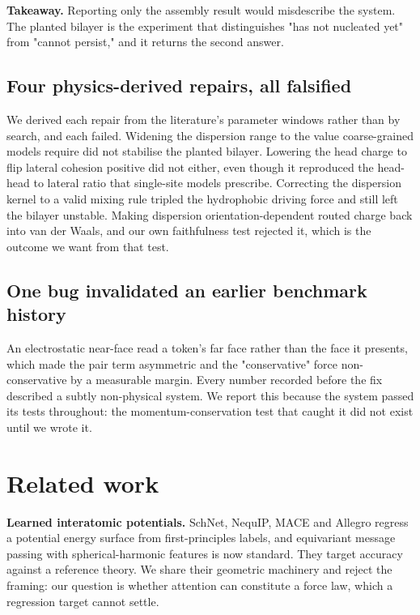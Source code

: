 \documentclass[10pt,twocolumn]{article}
\begin{document}
\textbf{Takeaway.} Reporting only the assembly result would misdescribe the system. The planted
bilayer is the experiment that distinguishes "has not nucleated yet" from "cannot persist," and it
returns the second answer.

\subsection{Four physics-derived repairs, all falsified}

We derived each repair from the literature's parameter windows rather than by search, and each
failed. Widening the dispersion range to the value coarse-grained models require did not stabilise
the planted bilayer. Lowering the head charge to flip lateral cohesion positive did not either, even
though it reproduced the head-head to lateral ratio that single-site models prescribe. Correcting the
dispersion kernel to a valid mixing rule tripled the hydrophobic driving force and still left the
bilayer unstable. Making dispersion orientation-dependent routed charge back into van der Waals, and our own
faithfulness test rejected it, which is the outcome we want from that test.

\subsection{One bug invalidated an earlier benchmark history}

An electrostatic near-face read a token's far face rather than the face it presents, which made the
pair term asymmetric and the "conservative" force non-conservative by a measurable margin. Every
number recorded before the fix described a subtly non-physical system. We report this because the
system passed its tests throughout: the momentum-conservation test that caught it did not exist
until we wrote it.

\section{Related work}

\textbf{Learned interatomic potentials.} SchNet, NequIP, MACE and Allegro regress a potential energy
surface from first-principles labels, and equivariant message passing with spherical-harmonic features
is now standard. They target accuracy against a reference theory. We share their geometric machinery
and reject the framing: our question is whether attention can constitute a force law, which a
regression target cannot settle.
\end{document}
